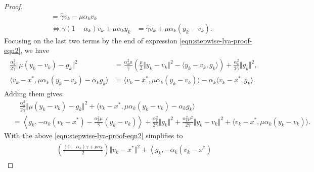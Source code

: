 \documentclass[12pt]{article}
\begin{document}
\begin{proof}
\begin{align*}
            = \hat \gamma v_k - \mu\alpha_k v_k
            \\
            \iff 
            \gamma(1 - \alpha_k) v_k + \mu \alpha_k y_k
            &= 
            \hat \gamma v_k + \mu \alpha_k(y_k - v_k). 
        \end{align*}
        Focusing on the last two terms by the end of expression \eqref{eqn:stepwise-lya-proof-eqn2}, we have  
        \begin{align}
         \label{eqn:stepwise-lya-proof-eqn2.1}
        \begin{split}
            \frac{\alpha^2_k}{2\hat \gamma} 
            \Vert \mu(y_k - v_k) - g_k\Vert^2
            & = 
            \frac{\alpha_k^2\mu}{\hat \gamma}
            \left(
                \frac{\mu}{2}\Vert y_k - v_k\Vert^2 
                - \langle y_k - v_k, g_k\rangle
            \right)
            + \frac{\alpha_k^2}{2\hat \gamma}\Vert g_k\Vert^2, 
            \\
            \langle v_k - x^*, \mu \alpha_k(y_k - v_k) - \alpha_k g_k\rangle
            &= 
            \langle v_k - x^*, \mu\alpha_k(y_k - v_k)\rangle 
            - \alpha_k \langle v_k - x^*, g_k\rangle. 
        \end{split} %
        \end{align}
        Adding them gives: 
        {\small
        \begin{align*}
            & \quad 
            \frac{\alpha^2_k}{2\hat \gamma} 
            \Vert \mu(y_k - v_k) - g_k\Vert^2
            + 
            \langle v_k - x^*, \mu \alpha_k(y_k - v_k) - \alpha_k g_k\rangle
            \\
            &= 
            \left\langle g_k, 
                - \alpha_k(v_k - x^*) 
                - \frac{\alpha_k^2\mu}{\hat \gamma}(y_k - v_k)
            \right\rangle
            + \frac{\alpha_k^2}{2\hat \gamma}\Vert g_k\Vert^2
            + \frac{\alpha_k^2 \mu^2}{2\hat \gamma}\Vert y_k - v_k\Vert^2
            + \langle v_k - x^*, \mu\alpha_k(y_k - v_k)\rangle. 
        \end{align*}
        }
        With the above \eqref{eqn:stepwise-lya-proof-eqn2} simplifies to 
        {\small
        \begin{align}\label{expr:stepwise-lya-expr2.2}
        \begin{split}
            & 
            \left(
            \frac{(1 - \alpha_k)\gamma + \mu \alpha_k}{2} 
            \right)\Vert v_k - x^*\Vert^2
            + 
            \left\langle g_k, 
                - \alpha_k(v_k - x^*) 

\end{split}
\end{align}}
\end{proof}
\end{document}
